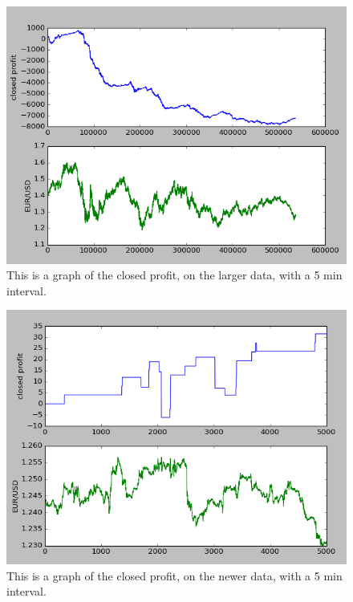 \documentclass[10pt]{IEEEtran}
\begin{document}
\begin{figure}
    \includegraphics[scale = 0.5]{fxdata-96-10000-20.png}
    \caption{This is a graph of the closed profit, on the larger data, with a 5 min interval.}
\end{figure}

\begin{figure}
    \includegraphics[scale = 0.5]{newdata-96-10000-20.png}
    \caption{This is a graph of the closed profit, on the newer data, with a 5 min interval.}
\end{figure}
\end{document}
